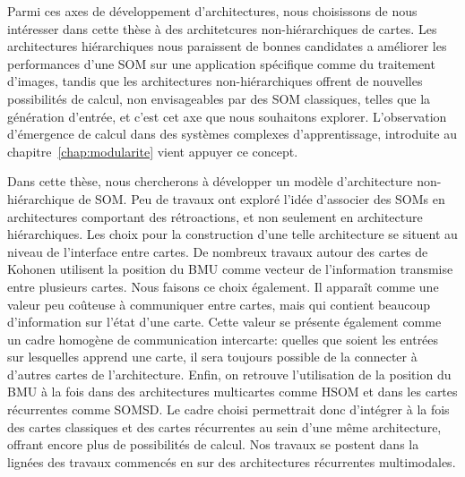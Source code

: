 \documentclass[../main]{subfiles}
\begin{document}
Parmi ces axes de développement d'architectures, nous choisissons de nous intéresser dans cette thèse à des architetcures non-hiérarchiques de cartes.
Les architectures hiérarchiques nous paraissent de bonnes candidates a améliorer les performances d'une SOM sur une application spécifique comme du traitement d'images, tandis que les architectures non-hiérarchiques offrent de nouvelles possibilités de calcul, non envisageables par des SOM classiques, telles que la génération d'entrée, et c'est cet axe que nous souhaitons explorer. L'observation d'émergence de calcul dans des systèmes complexes d'apprentissage, introduite au chapitre~\ref{chap:modularite} vient appuyer ce concept.

Dans cette thèse, nous chercherons à développer un modèle d'architecture non-hiérarchique de SOM. Peu de travaux ont exploré l'idée d'associer des SOMs en architectures comportant des rétroactions, et non seulement en architecture hiérarchiques.
Les choix pour la construction d'une telle architecture se situent au niveau de l'interface entre cartes. De nombreux travaux autour des cartes de Kohonen utilisent la position du BMU comme vecteur de l'information transmise entre plusieurs cartes. 
Nous faisons ce choix également. Il apparaît comme une valeur peu coûteuse à communiquer entre cartes, mais qui contient beaucoup d'information sur l'état d'une carte. Cette valeur se présente également comme un cadre homogène de communication intercarte: quelles que soient les entrées sur lesquelles apprend une carte, il sera toujours possible de la connecter à d'autres cartes de l'architecture. Enfin, on retrouve l'utilisation de la position du BMU à la fois dans des architectures multicartes comme HSOM et dans les cartes récurrentes comme SOMSD. Le cadre choisi permettrait donc d'intégrer à la fois des cartes classiques et des cartes récurrentes au sein d'une même architecture, offrant encore plus de possibilités de calcul. Nos travaux se postent dans la lignées des travaux commencés en \cite{baheux_towards_2014} sur des architectures récurrentes multimodales.
% 

\ifSubfilesClassLoaded{
    \printbibliography
}{}
\end{document}

